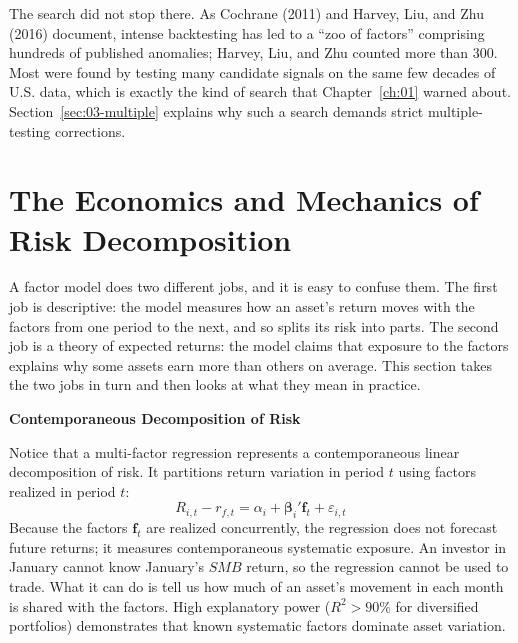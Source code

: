 The search did not stop there. As Cochrane (2011) and Harvey, Liu, and Zhu (2016) document, intense backtesting has led to a ``zoo of factors'' comprising hundreds of published anomalies; Harvey, Liu, and Zhu counted more than 300. Most were found by testing many candidate signals on the same few decades of U.S. data, which is exactly the kind of search that Chapter~\ref{ch:01} warned about. Section~\ref{sec:03-multiple} explains why such a search demands strict multiple-testing corrections.

\section{The Economics and Mechanics of Risk Decomposition}
\label{sec:03-decomposition}

A factor model does two different jobs, and it is easy to confuse them. The first job is descriptive: the model measures how an asset's return moves with the factors from one period to the next, and so splits its risk into parts. The second job is a theory of expected returns: the model claims that exposure to the factors explains why some assets earn more than others on average. This section takes the two jobs in turn and then looks at what they mean in practice.

\begin{callout}
\noindent \textbf{Contemporaneous Decomposition of Risk}

Notice that a multi-factor regression represents a contemporaneous linear decomposition of risk. It partitions return variation in period $t$ using factors realized in period $t$:
\begin{equation}
  R_{i,t} - r_{f,t} = \alpha_i + \boldsymbol{\beta}_i' \mathbf{f}_t + \varepsilon_{i,t}
\end{equation}
Because the factors $\mathbf{f}_t$ are realized concurrently, the regression does not forecast future returns; it measures contemporaneous systematic exposure. An investor in January cannot know January's $SMB$ return, so the regression cannot be used to trade. What it can do is tell us how much of an asset's movement in each month is shared with the factors. High explanatory power ($R^2 > 90\%$ for diversified portfolios) demonstrates that known systematic factors dominate asset variation.
\end{callout}

